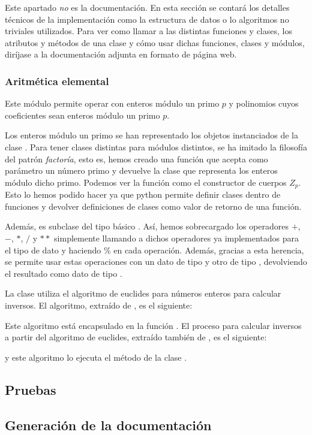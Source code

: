\begin{nota}
    Este apartado \emph{no} es la documentación. En esta sección se contará los detalles técnicos de la implementación como la estructura de datos o lo algoritmos no triviales utilizados. Para ver como llamar a las distintas funciones y clases, los atributos y métodos de una clase y cómo usar dichas funciones, clases y módulos, diríjase a la documentación adjunta en formato de página web.
\end{nota}

\subsubsection{Aritmética elemental}
\label{subs:Aritmética elemental}

Este módulo permite operar con enteros módulo un primo $p$ y polinomios
cuyos coeficientes sean enteros módulo un primo $p$.

Los enteros módulo un primo se han representado los objetos instanciados de la clase . Para tener clases distintas para módulos distintos, se ha imitado la filosofía del patrón \emph{factoría}, esto es, hemos creado una función  que acepta como parámetro un número primo y devuelve la clase que representa los enteros módulo dicho primo. Podemos ver la función  como el constructor de cuerpos $Z_p$. Esto lo hemos podido hacer ya que python permite definir clases dentro de funciones y devolver definiciones de clases como valor de retorno de una función.

Además,  es subclase del tipo básico . Así, hemos sobrecargado los operadores $+$, $-$, $*$, $/$ y $**$ simplemente llamando a dichos operadores ya implementados para el tipo de dato  y haciendo $\%$ en cada operación. Además, gracias a esta herencia, se permite usar estas operaciones con un dato de tipo  y otro de tipo , devolviendo el resultado como dato de tipo .

La clase  utiliza el algoritmo de euclides para números enteros para calcular inversos. El algoritmo, extraído de \cite{Menezes:1996}, es el siguiente:
\begin{algoritmo}
\end{algoritmo}
Este algoritmo está encapsulado en la función . El proceso para calcular inversos a partir del algoritmo de euclides, extraído también de \cite{Menezes:1996}, es el siguiente:
\begin{algoritmo}
\end{algoritmo}
y este algoritmo lo ejecuta el método  de la clase .


\subsection{Pruebas}
\label{sub:Pruebas}


\subsection{Generación de la documentación}
\label{sub:Generación de la documentación}

